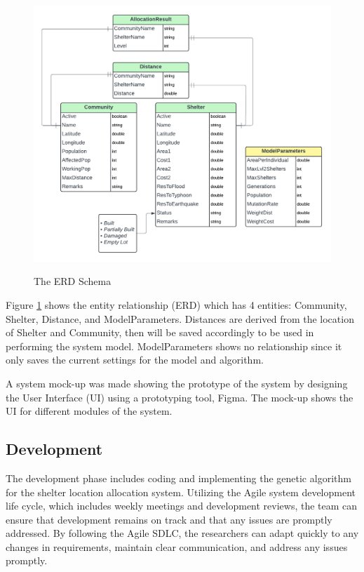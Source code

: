 	\begin{figure}[h!]
		\caption{The ERD Schema}
		\centering
		\includegraphics[width=\textwidth]{ERD}
		\label{ERD}
	\end{figure}
	
	Figure \ref{ERD} shows the entity relationship (ERD) which has 4 entities: Community, Shelter, Distance, and ModelParameters. Distances are derived from the location of Shelter and Community, then will be saved accordingly to be used in performing the system model. ModelParameters shows no relationship since it only saves the current settings for the model and algorithm.
	
	A system mock-up was made showing the prototype of the system by designing the User Interface (UI) using a prototyping tool, Figma. The mock-up shows the UI for different modules of the system.

\subsection{Development}
	The development phase includes coding and implementing the genetic algorithm for the shelter location allocation system. Utilizing the Agile system development life cycle, which includes weekly meetings and development reviews, the team can ensure that development remains on track and that any issues are promptly addressed. By following the Agile SDLC, the researchers can adapt quickly to any changes in requirements, maintain clear communication, and address any issues promptly.
	
